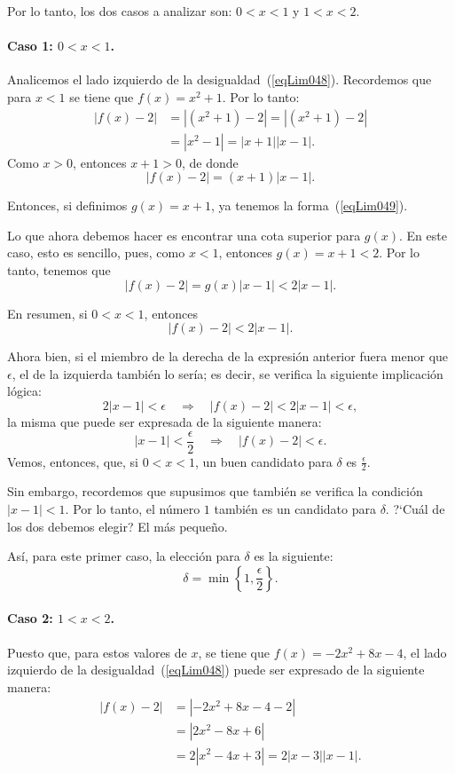 \begin{exemplo}[Solución]
Por lo tanto, los dos casos a analizar son: $0 < x < 1$ y $1 < x < 2$.

\paragraph{Caso 1: $0 < x < 1$.}
Analicemos el lado izquierdo de la desigualdad~(\ref{eqLim048}). Recordemos que para $x < 1$ se
tiene que $f(x) = x^2 + 1$. Por lo tanto:
\begin{align*}
	|f(x)-2| &= |(x^2+1)-2| = |(x^2 + 1) - 2| \\
  &= |x^2 - 1| = |x+1||x-1|.
\end{align*}
Como $x > 0$, entonces $x + 1 > 0$, de donde
\[
|f(x) - 2| = (x + 1)|x - 1|.
\]

Entonces, si definimos $g(x) = x + 1$, ya tenemos la forma~(\ref{eqLim049}).

Lo que ahora debemos hacer es encontrar una cota superior para $g(x)$. En este caso, esto es
sencillo, pues, como $x < 1$, entonces $g(x) = x + 1 < 2$. Por lo tanto, tenemos que
\[
	|f(x)-2| = g(x)|x - 1| < 2|x-1|.
\]

En resumen, si $0 < x < 1$, entonces
\begin{equation}
\label{eqLim050}
|f(x) - 2| < 2|x - 1|.
\end{equation}

Ahora bien, si el miembro de la derecha de la expresión anterior fuera menor que $\epsilon$, el de
la izquierda también lo sería; es decir, se verifica la siguiente implicación lógica:
\[
	2|x-1|<\epsilon \quad \Rightarrow \quad |f(x)-2|< 2|x - 1| < \epsilon,
\]
la misma que puede ser expresada de la siguiente manera:
\[
	|x-1| < \frac{\epsilon}{2} \quad \Rightarrow \quad |f(x)-2| < \epsilon.
\]
Vemos, entonces, que, si $0 < x < 1$, un buen candidato para $\delta$ es $\frac{\epsilon}{2}$.

Sin embargo, recordemos que supusimos que también se verifica la condición $|x - 1| < 1$. Por lo
tanto, el número $1$ también es un candidato para $\delta$. ?`Cuál de los dos debemos elegir? El más
pequeño.

Así, para este primer caso, la elección para $\delta$ es la siguiente:
\begin{equation}
\label{eqLim051}
\delta = \min\left\{1,\frac{\epsilon}{2}\right\}.
\end{equation}

\paragraph{Caso 2: $1 < x < 2$.}
Puesto que, para estos valores de $x$, se tiene que $f(x) = -2x^2 + 8x - 4$, el lado izquierdo de
la desigualdad~(\ref{eqLim048}) puede ser expresado de la siguiente manera:
\begin{align*}
|f(x) - 2| &= |-2x^2 + 8x - 4 - 2| \\
  &= |2x^2 - 8x + 6| \\
  &= 2|x^2 - 4x + 3| = 2|x - 3||x - 1|.
\end{align*}


\end{exemplo}
